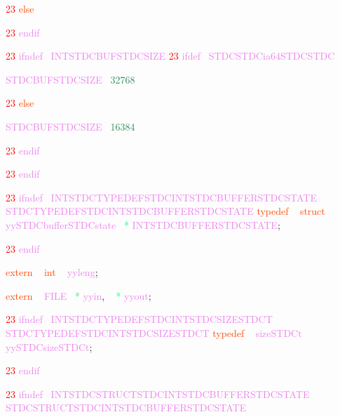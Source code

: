 \documentclass[8, usernames, dvipsnames]{beamer}
\begin{document}
\begin{frame}
 \textcolor{Red}{23}
\textcolor{OrangeRed}{else}

 
  \textcolor{Red}{23}
\textcolor{Violet}{endif}
 
 
  \textcolor{Red}{23}
\textcolor{Violet}{ifndef}\textcolor{White}{\ }
\textcolor{Violet}{INTSTDCBUFSTDCSIZE}
  \textcolor{Red}{23}
\textcolor{Violet}{ifdef}\textcolor{White}{\ }
\textcolor{Violet}{STDCSTDCia64STDCSTDC}
 
 \textcolor{Violet}{STDCBUFSTDCSIZE}\textcolor{White}{\ }
\textcolor{SeaGreen}{32768}

  \textcolor{Red}{23}
\textcolor{OrangeRed}{else}

 \end{frame}
\begin{frame}
\textcolor{Violet}{STDCBUFSTDCSIZE}\textcolor{White}{\ }
\textcolor{SeaGreen}{16384}

  \textcolor{Red}{23}
\textcolor{Violet}{endif}\textcolor{White}{\ }

  \textcolor{Red}{23}
\textcolor{Violet}{endif}
 
  \textcolor{Red}{23}
\textcolor{Violet}{ifndef}\textcolor{White}{\ }
\textcolor{Violet}{INTSTDCTYPEDEFSTDCINTSTDCBUFFERSTDCSTATE}
 \textcolor{Violet}{STDCTYPEDEFSTDCINTSTDCBUFFERSTDCSTATE}
 \textcolor{OrangeRed}{typedef}
\textcolor{White}{\ }
\textcolor{OrangeRed}{struct}
\textcolor{White}{\ }
\textcolor{Violet}{yySTDCbufferSTDCstate}\textcolor{White}{\ }
\textcolor{SpringGreen}{*}
\textcolor{Violet}{INTSTDCBUFFERSTDCSTATE}\textcolor{Sepia}{;}

  \textcolor{Red}{23}
\textcolor{Violet}{endif}
 
 \textcolor{OrangeRed}{extern}
\textcolor{White}{\ }
\textcolor{OrangeRed}{int}
\textcolor{White}{\ }
\textcolor{Violet}{yyleng}\textcolor{Sepia}{;}

 \end{frame}
\begin{frame}

 \textcolor{OrangeRed}{extern}
\textcolor{White}{\ }
\textcolor{Violet}{FILE}\textcolor{White}{\ }
\textcolor{SpringGreen}{*}
\textcolor{Violet}{yyin}\textcolor{Sepia}{,}
\textcolor{White}{\ }
\textcolor{SpringGreen}{*}
\textcolor{Violet}{yyout}\textcolor{Sepia}{;}

 
  \textcolor{Red}{23}
\textcolor{Violet}{ifndef}\textcolor{White}{\ }
\textcolor{Violet}{INTSTDCTYPEDEFSTDCINTSTDCSIZESTDCT}
 \textcolor{Violet}{STDCTYPEDEFSTDCINTSTDCSIZESTDCT}
 \textcolor{OrangeRed}{typedef}
\textcolor{White}{\ }
\textcolor{Violet}{sizeSTDCt}\textcolor{White}{\ }
\textcolor{Violet}{yySTDCsizeSTDCt}\textcolor{Sepia}{;}

  \textcolor{Red}{23}
\textcolor{Violet}{endif}
 
  \textcolor{Red}{23}
\textcolor{Violet}{ifndef}\textcolor{White}{\ }
\textcolor{Violet}{INTSTDCSTRUCTSTDCINTSTDCBUFFERSTDCSTATE}
 \textcolor{Violet}{STDCSTRUCTSTDCINTSTDCBUFFERSTDCSTATE}
 \end{frame}
\end{document}
